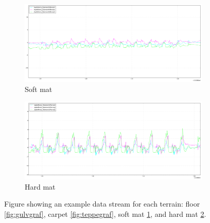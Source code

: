 \documentclass[USenglish]{ifimaster}  %
\begin{document}
	\begin{figure}[h] \ContinuedFloat
	\begin{subfigure}[h]{\textwidth}
		\includegraphics[width=\textwidth,height=\textheight,keepaspectratio]{Figures/mykmattegraf}
		\caption{Soft mat}
		\label{fig:mykmattegraf}
	\end{subfigure}
	
	\begin{subfigure}[h]{\textwidth}
		\includegraphics[width=\textwidth,height=\textheight,keepaspectratio]{Figures/mattebgraf}
		\caption{Hard mat}
		\label{fig:mattebgraf}
	\end{subfigure}
	\caption[Example of data stream for each terrain]{Figure showing an example data stream for each terrain: floor \ref{fig:gulvgraf}, carpet \ref{fig:teppegraf}, soft mat \ref{fig:mykmattegraf}, and hard mat \ref{fig:mattebgraf}.}
	\label{fig:gtmgraf}
\end{figure}
\FloatBarrier
\end{document}
